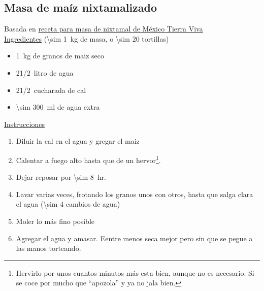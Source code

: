 \subsection{Masa de maíz nixtamalizado}
\label{receta:masa-maiz}

Basada en \href{https://mexicotierraviva.org/con-maiz-masa-de-nixtamal/}{receta para masa de nixtamal de México Tierra Viva}\\

\underline{Ingredientes} (\SI{\sim 1}{kg} de masa, o \num{\sim 20} tortillas)
\begin{itemize}
\item \SI{1}{kg} de granos de maiz seco
\item 2\SI{1/2}{litro} de agua
\item 2\SI{1/2}{cucharada} de cal
\item \SI{\sim 300}{ml} de agua extra
\end{itemize}

\underline{Instrucciones}
\begin{enumerate}
\item Diluir la cal en el agua y gregar el maiz
\item Calentar a fuego alto hasta que de un hervor\footnote{Hervirlo por unos cuantos minutos más esta bien, aunque no es necesario. Si se coce por mucho que ``apozola'' y ya no jala bien.}.
\item Dejar reposar por \SI{\sim 8}{hr}.
\item Lavar varias veces, frotando los granos unos con otros, hasta que salga clara el agua (\num{\sim 4} cambios de agua)
\item Moler lo más fino posible
\item Agregar el agua y amasar. Eentre menos seca mejor pero sin que se pegue a las manos torteando. 
\end{enumerate}
